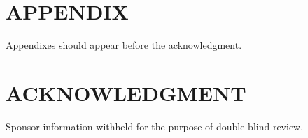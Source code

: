 \documentclass[letterpaper, 10 pt, conference]{ieeeconf}  %
\begin{document}




\section*{APPENDIX}

Appendixes should appear before the acknowledgment.

\section*{ACKNOWLEDGMENT}
Sponsor information withheld for the purpose of double-blind review. 



\end{document}
